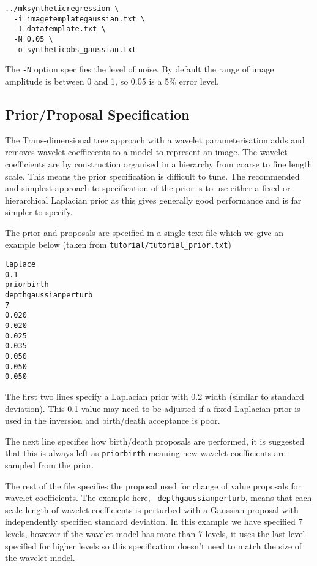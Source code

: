 \documentclass[a4paper,12pt]{article}
\begin{document}
\begin{verbatim}
../mksyntheticregression \
  -i imagetemplategaussian.txt \
  -I datatemplate.txt \
  -N 0.05 \
  -o syntheticobs_gaussian.txt
\end{verbatim}

The {\tt -N} option specifies the level of noise. By default the range of image
amplitude is between 0 and 1, so 0.05 is a 5\% error level.

\subsection{Prior/Proposal Specification}
The Trans-dimensional tree approach with a wavelet parameterisation adds and removes
wavelet coeffiecents to a model to represent an image. The wavelet coefficients are
by construction organised in a hierarchy from coarse to fine length scale. This
means the prior specification is difficult to tune. The recommended and simplest
approach to specification of the prior is to use either a fixed or hierarchical
Laplacian prior as this gives generally good performance and is far simpler to
specify.

The prior and proposals are specified in a single text file which we give
an example below (taken from {\tt tutorial/tutorial\_prior.txt})

\begin{verbatim}
laplace
0.1
priorbirth
depthgaussianperturb
7
0.020
0.020
0.025
0.035
0.050
0.050
0.050
\end{verbatim}

The first two lines specify a Laplacian prior with 0.2 width (similar to standard
deviation). This 0.1 value may need to be adjusted if a fixed Laplacian prior is
used in the inversion and birth/death acceptance is poor.

The next line specifies how birth/death proposals are performed, it is
suggested that this is always left as {\tt priorbirth} meaning new
wavelet coefficients are sampled from the prior.

The rest of the file specifies the proposal used for change of value
proposals for wavelet coefficients. The example here, {\tt
  depthgaussianperturb}, means that each scale length of wavelet
coefficients is perturbed with a Gaussian proposal with independently
specified standard deviation. In this example we have specified 7
levels, however if the wavelet model has more than 7 levels, it uses
the last level specified for higher levels so this specification
doesn't need to match the size of the wavelet model.
\end{document}
